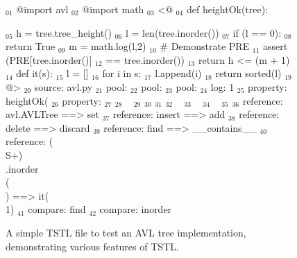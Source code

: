 \documentclass{sig-alternate}
\begin{document}
\begin{figure}
\begin{code}
$_{01}$ @import avl
$_{02}$ @import math
\vspace{0.1in}
$_{03}$ <@
$_{04}$ def heightOk(tree):

$_{05}$     h = tree.tree\_height()
$_{06}$     l = len(tree.inorder())
$_{07}$     if (l == 0):
$_{08}$        return True
$_{09}$     m = math.log(l,2)
$_{10}$     \# Demonstrate PRE
$_{11}$     assert (PRE[tree.inorder()] 
$_{12}$             == tree.inorder())
$_{13}$     return h <= (m + 1)
$_{14}$ def it(s):
$_{15}$     l = []
$_{16}$     for i in s:
$_{17}$        l.append(i)
$_{18}$     return sorted(l)
$_{19}$ @>
\vspace{0.1in}
$_{20}$ source: avl.py
\vspace{0.1in}
$_{21}$ pool: %
$_{22}$ pool: %
$_{23}$ pool: %
\vspace{0.1in}
$_{24}$ log: 1 %
\vspace{0.1in}
$_{25}$ property: heightOk(%
$_{26}$ property: %
\vspace{0.1in}
$_{27}$ %
$_{28}$ ~%
$_{29}$ %
$_{30}$ %
$_{31}$ %
$_{32}$ ~%
$_{33}$ ~%
$_{34}$ ~%
$_{35}$ %
\vspace{0.1in}
$_{36}$ reference: avl.AVLTree ==> set
$_{37}$ reference: insert ==> add
$_{38}$ reference: delete ==> discard
$_{39}$ reference: find ==> \_\_contains\_\_
$_{40}$ reference: (\\S+)\\.inorder\\(\\) ==> it(\\1)
\vspace{0.1in}
$_{41}$ compare: find
$_{42}$ compare: inorder
\end{code}
\caption{A simple TSTL file to test an AVL tree implementation,
  demonstrating various features of TSTL.}
\label{fig:avl}
\end{figure}
\end{document}
